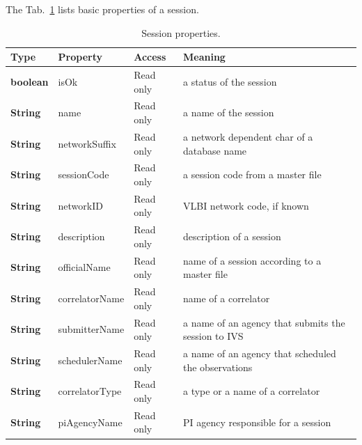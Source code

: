 \documentclass [10pt,letterpaper]{report}
\begin{document}
The Tab.~\ref{tab-scr-session-1} lists basic properties of a session.

\begin{table}[htb]
\centering
\footnotesize
\begin{tabular}{lllp{}}
\hline
Type & Property & Access & Meaning\\
\hline
  {\bf boolean} & isOk          & Read only & a status of the session\\
  {\bf String}  & name          & Read only & a name of the session\\
  {\bf String}  & networkSuffix & Read only & a network dependent char of a database name\\
  {\bf String}  & sessionCode   & Read only & a session code from a master file\\
  {\bf String}  & networkID     & Read only & VLBI network code, if known\\
  {\bf String}  & description   & Read only & description of a session\\
  {\bf String}  & officialName  & Read only & name of a session according to a master file\\
  {\bf String}  & correlatorName& Read only & name of a correlator\\
  {\bf String}  & submitterName & Read only & a name of an agency that submits the session to IVS\\
  {\bf String}  & schedulerName & Read only & a name of an agency that scheduled the observations\\
%
  {\bf String}  & correlatorType& Read only & a type or a name of a correlator\\
  {\bf String}  & piAgencyName  & Read only & PI agency responsible for a session\\
\hline
\end{tabular}
\caption{Session properties.}
\label{tab-scr-session-1}
\end{table}
\end{document}
